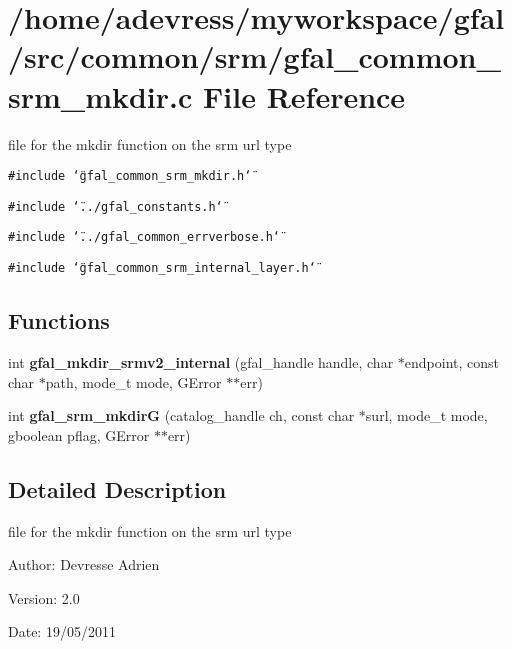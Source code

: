 \section{/home/adevress/myworkspace/gfal/src/common/srm/gfal\_\-common\_\-srm\_\-mkdir.c File Reference}
\label{gfal__common__srm__mkdir_8c}
file for the mkdir function on the srm url type 

{\tt \#include \char`\"{}gfal\_\-common\_\-srm\_\-mkdir.h\char`\"{}}\par
{\tt \#include \char`\"{}../gfal\_\-constants.h\char`\"{}}\par
{\tt \#include \char`\"{}../gfal\_\-common\_\-errverbose.h\char`\"{}}\par
{\tt \#include \char`\"{}gfal\_\-common\_\-srm\_\-internal\_\-layer.h\char`\"{}}\par
\subsection*{Functions}
\begin{CompactItemize}
\item 
int \textbf{gfal\_\-mkdir\_\-srmv2\_\-internal} (gfal\_\-handle handle, char $\ast$endpoint, const char $\ast$path, mode\_\-t mode, GError $\ast$$\ast$err)\label{gfal__common__srm__mkdir_8c_da43b13d5c3fe65b5dcadd8daff2bafe}

\item 
int \textbf{gfal\_\-srm\_\-mkdir\-G} (catalog\_\-handle ch, const char $\ast$surl, mode\_\-t mode, gboolean pflag, GError $\ast$$\ast$err)\label{gfal__common__srm__mkdir_8c_93289fd14057ff871e9dd489722f1a76}

\end{CompactItemize}


\subsection{Detailed Description}
file for the mkdir function on the srm url type 

\begin{Desc}
\item[Author:]Devresse Adrien \end{Desc}
\begin{Desc}
\item[Version:]2.0 \end{Desc}
\begin{Desc}
\item[Date:]19/05/2011 \end{Desc}
